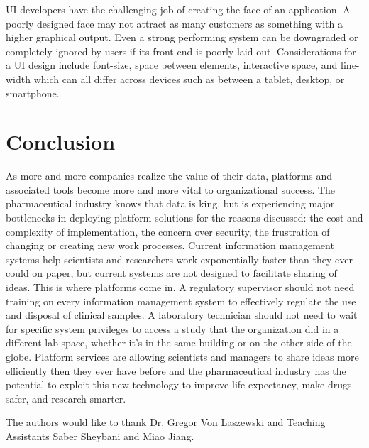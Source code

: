 \documentclass[sigconf]{acmart}
\begin{document}
UI developers have the challenging job of creating the face of an application. A poorly designed face may not attract as many customers as something with a higher graphical output. Even a strong performing system can be downgraded or completely ignored by users if its front end is poorly laid out. Considerations for a UI design include font-size, space between elements, interactive space, and line-width which can all differ across devices such as between a tablet, desktop, or smartphone\cite{Macik}. 

\section{Conclusion}
As more and more companies realize the value of their data, platforms and associated tools become more and more vital to organizational success. The pharmaceutical industry knows that data is king, but is experiencing major bottlenecks in deploying platform solutions for the reasons discussed: the cost and complexity of implementation, the concern over security, the frustration of changing or creating new work processes. Current information management systems help scientists and researchers work exponentially faster than they ever could on paper, but current systems are not designed to facilitate sharing of ideas. This is where platforms come in. A regulatory supervisor should not need training on every information management system to effectively regulate the use and disposal of clinical samples. A laboratory technician should not need to wait for specific system privileges to access a study that the organization did in a different lab space, whether it's in the same building or on the other side of the globe. Platform services are allowing scientists and managers to share ideas more efficiently then they ever have before and the pharmaceutical industry has the potential to exploit this new technology to improve life expectancy, make drugs safer, and research smarter. 

\begin{acks}

  The authors would like to thank Dr. Gregor Von Laszewski  and Teaching Assistants Saber Sheybani and Miao Jiang.

\end{acks}


 
\end{document}
